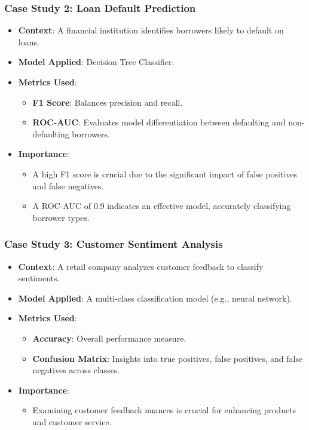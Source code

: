 \documentclass[aspectratio=169]{beamer}
\begin{document}
\begin{frame}[fragile]
    \frametitle{Case Study 2: Loan Default Prediction}
    \begin{itemize}
        \item \textbf{Context}: A financial institution identifies borrowers likely to default on loans.
        \item \textbf{Model Applied}: Decision Tree Classifier.
        \item \textbf{Metrics Used}:
            \begin{itemize}
                \item \textbf{F1 Score}: Balances precision and recall.
                \item \textbf{ROC-AUC}: Evaluates model differentiation between defaulting and non-defaulting borrowers.
            \end{itemize}
        \item \textbf{Importance}:
            \begin{itemize}
                \item A high F1 score is crucial due to the significant impact of false positives and false negatives.
                \item A ROC-AUC of 0.9 indicates an effective model, accurately classifying borrower types.
            \end{itemize}
    \end{itemize}
\end{frame}

\begin{frame}[fragile]
    \frametitle{Case Study 3: Customer Sentiment Analysis}
    \begin{itemize}
        \item \textbf{Context}: A retail company analyzes customer feedback to classify sentiments.
        \item \textbf{Model Applied}: A multi-class classification model (e.g., neural network).
        \item \textbf{Metrics Used}:
            \begin{itemize}
                \item \textbf{Accuracy}: Overall performance measure.
                \item \textbf{Confusion Matrix}: Insights into true positives, false positives, and false negatives across classes.
            \end{itemize}
        \item \textbf{Importance}:
            \begin{itemize}
                \item Examining customer feedback nuances is crucial for enhancing products and customer service.
            \end{itemize}
    \end{itemize}
\end{frame}
\end{document}
